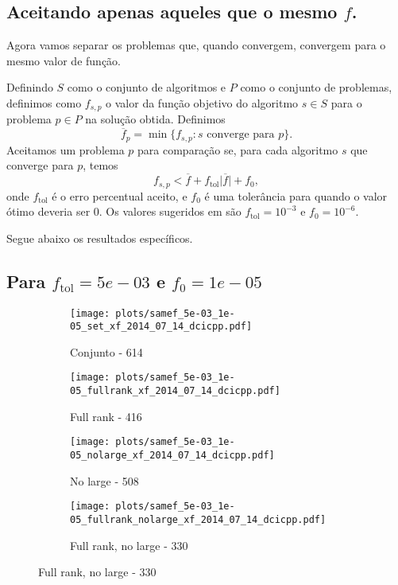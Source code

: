 \documentclass{article}
\newcommand{\ftol}{f_{\mbox{tol}}}
\begin{document}
\subsection{Aceitando apenas aqueles que o mesmo $f$. }

Agora vamos separar os problemas que, quando convergem, convergem para o mesmo
valor de função.

Definindo $S$ como o conjunto de algoritmos e $P$ como o conjunto de problemas,
definimos como $f_{s,p}$ o valor da função objetivo do algoritmo $s \in S$ para
o problema $p \in P$ na solução obtida.
Definimos
$$ \overline{f}_{p} = \min\{f_{s,p} : s \mbox{ converge para } p\}. $$
Aceitamos um problema $p$ para comparação se, para cada algoritmo $s$ que
converge para $p$, temos
$$ f_{s,p} < \overline{f} + \ftol\vert\overline{f}\vert + f_0, $$
onde $\ftol$ é o erro percentual aceito, e $f_0$ é uma tolerância para quando o
valor ótimo deveria ser $0$.
Os valores sugeridos em \cite{bib:compare-optimal-values} são $\ftol=10^{-3}$ e
$f_0 = 10^{-6}$.

Segue abaixo os resultados específicos.

\subsection{Para $\ftol = 5e-03$ e $f_0 = 1e-05$}

\begin{figure}[H]
  \centering
  \begin{subfigure}{0.48\textwidth}
    \texttt{[image: plots/samef\_5e-03\_1e-05\_set\_xf\_2014\_07\_14\_dcicpp.pdf]}
    \caption{Conjunto - 614}
  \end{subfigure}
  \begin{subfigure}{0.48\textwidth}
    \texttt{[image: plots/samef\_5e-03\_1e-05\_fullrank\_xf\_2014\_07\_14\_dcicpp.pdf]}
    \caption{Full rank - 416}
  \end{subfigure}
  \begin{subfigure}{0.48\textwidth}
    \texttt{[image: plots/samef\_5e-03\_1e-05\_nolarge\_xf\_2014\_07\_14\_dcicpp.pdf]}
    \caption{No large - 508}
  \end{subfigure}
  \begin{subfigure}{0.48\textwidth}
    \texttt{[image: plots/samef\_5e-03\_1e-05\_fullrank\_nolarge\_xf\_2014\_07\_14\_dcicpp.pdf]}
    \caption{Full rank, no large - 330}
  \end{subfigure}
\end{figure}
\end{document}
